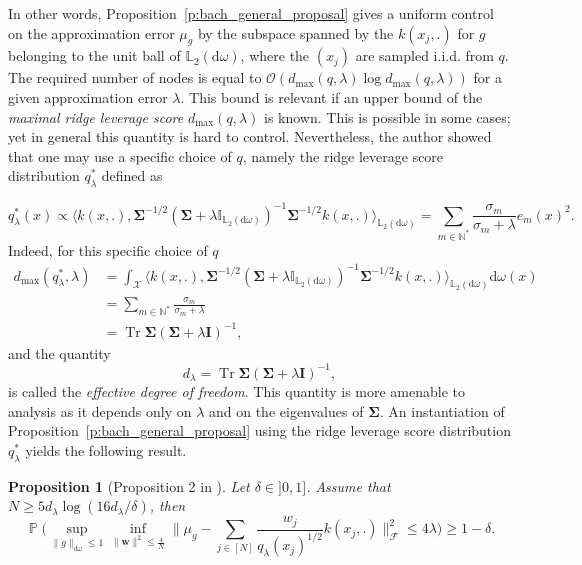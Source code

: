 \documentclass[twoside,11pt]{book}
\newtheorem{proposition}{Proposition}
\DeclareMathOperator{\Tr}{Tr}
\DeclareMathOperator{\Prb}{\mathbb{P}}
\DeclareMathOperator{\X}{\mathcal{X}}
\begin{document}
In other words, Proposition~\ref{p:bach_general_proposal} gives a uniform  control on the approximation error $\mu_{g}$ by the subspace spanned by the $k(x_{j},.)$ for $g$ belonging to the unit ball of $\mathbb{L}_{2}(\mathrm{d}\omega)$, where the $(x_{j})$ are sampled i.i.d. from $q$. The required number of nodes is equal to $\mathcal{O}(d_{\max}(q,\lambda)\log d_{\max}(q,\lambda))$ for a given approximation error $\lambda$. This bound is relevant if an upper bound of the \emph{maximal ridge leverage score} $d_{\max}(q,\lambda)$ is known. This is possible in some cases; yet in general this quantity is hard to control. Nevertheless, the author showed that one may use a specific choice of $q$, namely the ridge leverage score distribution $q_{\lambda}^{*}$ defined as

\begin{equation}
q_{\lambda}^*(x) \propto \langle k(x,.), \bm{\Sigma}^{-1/2}(\bm{\Sigma}+ \lambda \mathbb{I}_{\mathbb{L}_{2}(\mathrm{d}\omega)})^{-1}\bm{\Sigma}^{-1/2} k(x,.) \rangle_{\mathbb{L}_{2}(\mathrm{d}\omega)} = \sum\limits_{m \in \mathbb{N}^{*}} \frac{\sigma_{m}}{\sigma_{m}+\lambda} e_{m}(x)^{2}.
\label{e:proposalBach}
\end{equation}
Indeed, for this specific choice of $q$
\begin{align}
d_{\max}(q_{\lambda}^{*},\lambda) & = \int_{\X}\langle k(x,.), \bm{\Sigma}^{-1/2}(\bm{\Sigma}+ \lambda \mathbb{I}_{\mathbb{L}_{2}(\mathrm{d}\omega)})^{-1}\bm{\Sigma}^{-1/2} k(x,.) \rangle_{\mathbb{L}_{2}(\mathrm{d}\omega)} \mathrm{d}\omega(x) \nonumber \\
& = \sum\limits_{m \in \mathbb{N}^{*}} \frac{\sigma_{m}}{\sigma_{m}+\lambda} \nonumber\\
& =\Tr \bm{\Sigma}(\bm{\Sigma} + \lambda \bm{I})^{-1}  ,
\end{align}
and the quantity 
\begin{equation}
d_\lambda = \Tr \bm{\Sigma}(\bm{\Sigma} + \lambda \bm{I})^{-1},
\end{equation}
is called the \emph{effective degree of freedom}. This quantity is more amenable to analysis as it depends only on $\lambda$ and on the eigenvalues of $\bm{\Sigma}$.
An instantiation of Proposition~\ref{p:bach_general_proposal} using the ridge leverage score distribution $q_{\lambda}^{*}$ yields the following result.

\begin{proposition}[Proposition 2 in \cite{Bac17}]
\label{p:bach}
Let $\delta \in ]0,1]$. Assume that $N \geq 5 d_\lambda \log(16 d_\lambda / \delta)$, then
\begin{equation}
\Prb \bigg( \sup\limits_{\|g\|_{\mathrm{d}\omega} \leq 1} \inf\limits_{\|\bm{w}\|^{2}\leq \frac{4}{N}} \Big\| \mu_{g} - \sum\limits_{j \in [N]} \frac{w_{j}}{q_\lambda(x_{j})^{1/2}} k(x_{j},.)\Big\|_{\mathcal{F}}^{2} \leq 4\lambda \bigg) \geq 1- \delta .
\end{equation}
\end{proposition}
\end{document}
